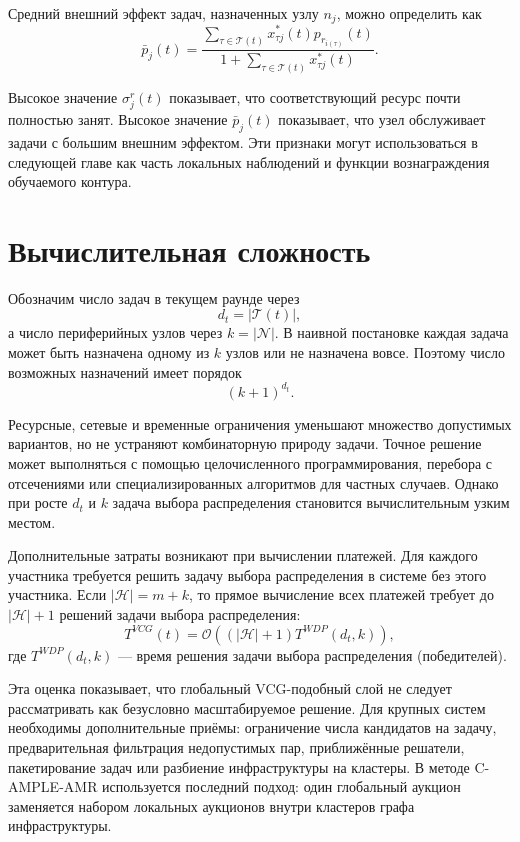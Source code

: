 Средний внешний эффект задач, назначенных узлу $n_j$, можно определить как
\begin{equation}
\bar{p}_j(t)=
\frac{\sum_{\tau\in\mathcal{T}(t)}x^*_{\tau j}(t)p_{r_{i(\tau)}}(t)}
{1+\sum_{\tau\in\mathcal{T}(t)}x^*_{\tau j}(t)}.
\label{eq:ch3_average_externality}
\end{equation}

Высокое значение $\sigma^r_j(t)$ показывает, что соответствующий ресурс почти полностью занят. Высокое значение $\bar{p}_j(t)$ показывает, что узел обслуживает задачи с большим внешним эффектом. Эти признаки могут использоваться в следующей главе как часть локальных наблюдений и функции вознаграждения обучаемого контура.

\section{Вычислительная сложность}

Обозначим число задач в текущем раунде через
\[
d_t=|\mathcal{T}(t)|,
\]
а число периферийных узлов через $k=|\mathcal{N}|$. В наивной постановке каждая задача может быть назначена одному из $k$ узлов или не назначена вовсе. Поэтому число возможных назначений имеет порядок
\begin{equation}
(k+1)^{d_t}.
\label{eq:ch3_assignment_count}
\end{equation}

Ресурсные, сетевые и временные ограничения уменьшают множество допустимых вариантов, но не устраняют комбинаторную природу задачи. Точное решение может выполняться с помощью целочисленного программирования, перебора с отсечениями или специализированных алгоритмов для частных случаев. Однако при росте $d_t$ и $k$ задача выбора распределения становится вычислительным узким местом.

Дополнительные затраты возникают при вычислении платежей. Для каждого участника требуется решить задачу выбора распределения в системе без этого участника. Если $|\mathcal{H}|=m+k$, то прямое вычисление всех платежей требует до $|\mathcal{H}|+1$ решений задачи выбора распределения:
\begin{equation}
T^{VCG}(t)=\mathcal{O}\left((|\mathcal{H}|+1)T^{WDP}(d_t,k)\right),
\label{eq:ch3_vcg_complexity}
\end{equation}
где $T^{WDP}(d_t,k)$ --- время решения задачи выбора распределения (победителей).

Эта оценка показывает, что глобальный VCG-подобный слой не следует рассматривать как безусловно масштабируемое решение. Для крупных систем необходимы дополнительные приёмы: ограничение числа кандидатов на задачу, предварительная фильтрация недопустимых пар, приближённые решатели, пакетирование задач или разбиение инфраструктуры на кластеры. В методе C-AMPLE-AMR используется последний подход: один глобальный аукцион заменяется набором локальных аукционов внутри кластеров графа инфраструктуры.

